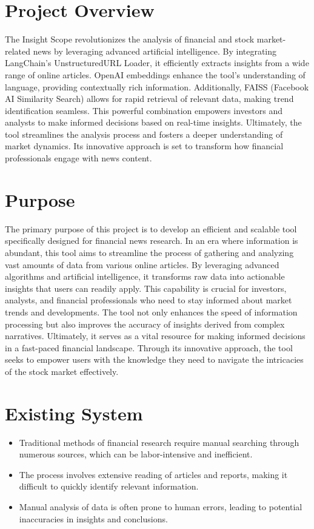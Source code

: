 \documentclass[12pt,a4paper]{report}
\begin{document}
{\section{Project Overview}
The Insight Scope revolutionizes the analysis of financial and stock market-related news by leveraging advanced artificial intelligence. By integrating LangChain’s UnstructuredURL Loader, it efficiently extracts insights from a wide range of online articles. OpenAI embeddings enhance the tool's understanding of language, providing contextually rich information. Additionally, FAISS (Facebook AI Similarity Search) allows for rapid retrieval of relevant data, making trend identification seamless. This powerful combination empowers investors and analysts to make informed decisions based on real-time insights. Ultimately, the tool streamlines the analysis process and fosters a deeper understanding of market dynamics. Its innovative approach is set to transform how financial professionals engage with news content.
\\


\section{Purpose}
The primary purpose of this project is to develop an efficient and scalable tool specifically designed for financial news research. In an era where information is abundant, this tool aims to streamline the process of gathering and analyzing vast amounts of data from various online articles. By leveraging advanced algorithms and artificial intelligence, it transforms raw data into actionable insights that users can readily apply. This capability is crucial for investors, analysts, and financial professionals who need to stay informed about market trends and developments. The tool not only enhances the speed of information processing but also improves the accuracy of insights derived from complex narratives. Ultimately, it serves as a vital resource for making informed decisions in a fast-paced financial landscape. Through its innovative approach, the tool seeks to empower users with the knowledge they need to navigate the intricacies of the stock market effectively.
\section{Existing System}
\begin{itemize}
	\item Traditional methods of financial research require manual searching through numerous sources, which can be labor-intensive and inefficient.
	\item The process involves extensive reading of articles and reports, making it difficult to quickly identify relevant information.
	\item Manual analysis of data is often prone to human errors, leading to potential inaccuracies in insights and conclusions.
\end{itemize}
}
\end{document}
